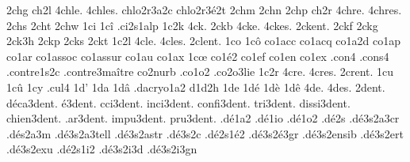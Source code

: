 {2chg
ch2l
4chle.
4chles.
                    chlo2r3a2c
                    chlo2r3é2t
2chm
2chn
2chp
ch2r
4chre.
4chres.
2chs
2cht
2chw
1ci
1cî
                    .ci2s1alp
1c2k
4ck.
2ckb
4cke.
4ckes.
2ckent. %
2ckf
2ckg
2ck3h
2ckp
2cks
2ckt
1c2l
4cle.
4cles.
2clent. %
1co
1cô
                    co1acc
                    co1acq
                    co1a2d
                    co1ap
                    co1ar
                    co1assoc
                    co1assur
                    co1au
                    co1ax
1cœ
                    co1é2
                    co1ef
                    co1en
                    co1ex
                    .con4  %
                    .cons4 %
                    .contre1s2c
                    .contre3maître %
                    co2nurb
                    .co1o2
                    .co2o3lie
1c2r
4cre.
4cres.
2crent. %
1cu
1cû
1cy
.cul4 %
1d'
1da
1dâ
                    .dacryo1a2
d1d2h
1de
1dé
1dè
1dê
4de.
4des.
     2dent.
 déca3dent.
    é3dent.
  cci3dent.
 inci3dent.
confi3dent.
  tri3dent.
dissi3dent.
chien3dent.
  .ar3dent.
 impu3dent.
  pru3dent.
%
                    .dé1a2
                    .dé1io
                    .dé1o2
                    .dé2s %
                    .dé3s2a3cr
                    .dés2a3m %
                    .dé3s2a3tell
                    .dé3s2astr
                    .dé3s2c %
                    .dé2s1é2
                    .dé3s2é3gr
                    .dé3s2ensib
                    .dé3s2ert
                    .dé3s2exu
                    .dé2s1i2
                    .dé3s2i3d
                    .dé3s2i3gn
}
